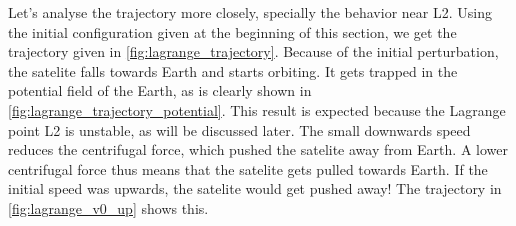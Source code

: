 Let's analyse the trajectory more closely, specially the behavior near L2. Using the initial configuration given at the beginning of this section, we get the trajectory given in \autoref{fig:lagrange_trajectory}. Because of the initial perturbation, the satelite falls towards Earth and starts orbiting. It gets trapped in the potential field of the Earth, as is clearly shown in \autoref{fig:lagrange_trajectory_potential}. This result is expected because the Lagrange point L2 is unstable, as will be discussed later. The small downwards speed reduces the centrifugal force, which pushed the satelite away from Earth. A lower centrifugal force thus means that the satelite gets pulled towards Earth. If the initial speed was upwards, the satelite would get pushed away! The trajectory in \autoref{fig:lagrange_v0_up} shows this.

